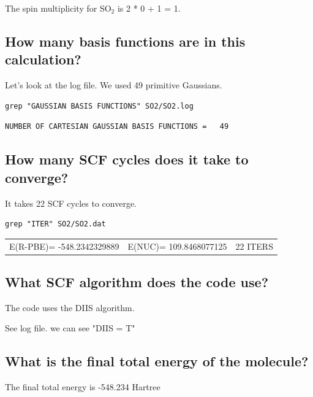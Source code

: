 \documentclass[11pt]{article}
\begin{document}
The spin multiplicity for SO\(_{\text{2}}\) is 2 * 0 + 1 = 1. 

\subsection{How many basis functions are in this calculation?}
\label{sec:orgb3a24c5}

Let's look at the log file. We used 49 primitive Gaussians.
\begin{verbatim}
grep "GAUSSIAN BASIS FUNCTIONS" SO2/SO2.log
\end{verbatim}

\begin{verbatim}
NUMBER OF CARTESIAN GAUSSIAN BASIS FUNCTIONS =   49
\end{verbatim}

\subsection{How many SCF cycles does it take to converge?}
\label{sec:org6cc14ec}

It takes 22 SCF cycles to converge.

\begin{verbatim}
grep "ITER" SO2/SO2.dat
\end{verbatim}

\begin{center}
\begin{tabular}{lll}
E(R-PBE)=     -548.2342329889 & E(NUC)=  109.8468077125 & 22 ITERS\\
\end{tabular}
\end{center}

\subsection{What SCF algorithm does the code use?}
\label{sec:orgbaba4ed}

The code uses the DIIS algorithm.

See log file. we can see "DIIS = T"

\subsection{What is the final total energy of the molecule?}
\label{sec:org7bc710a}

The final total energy is -548.234 Hartree
\end{document}

